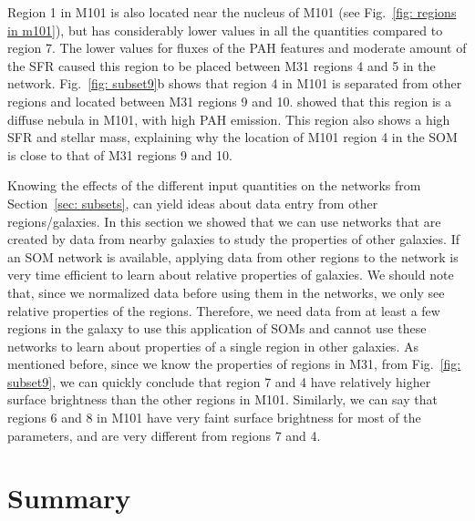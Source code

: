     Region 1 in M101 is also located near the nucleus of M101 (see Fig.~\ref{fig: regions in m101}), but has considerably lower values in all the quantities compared to region 7.
    The lower values for fluxes of the PAH features and moderate amount of the SFR caused this region to be placed between M31 regions 4 and 5 in the network. 
    Fig.~\ref{fig: subset9}b shows that region 4 in M101 is separated from other regions and located between M31 regions 9 and 10.
    \cite{Gordon08} showed that this region is a diffuse nebula in M101, with high PAH emission. 
    This region also shows a high SFR and stellar mass, explaining why the location of M101 region 4 in the SOM is close to that of M31 regions 9 and 10.
    
    Knowing the effects of the different input quantities on the networks from Section~\ref{sec: subsets}, can yield ideas about data entry from other regions/galaxies.
    In this section we showed that we can use networks that are created by data from nearby galaxies to study the properties of other galaxies.
    If an SOM network is available, applying data from other regions to the network is very time efficient to learn about relative properties of galaxies.
    We should note that, since we normalized data before using them in the networks, we only see relative properties of the regions.
    Therefore, we need data from at least a few regions in the galaxy to use this application of SOMs and cannot use these networks to learn about properties of a single region in other galaxies.
    As mentioned before, since we know the properties of regions in M31, from Fig.~\ref{fig: subset9}, we can quickly conclude that region 7 and 4 have relatively higher surface brightness than the other regions in M101. 
    Similarly, we can say that regions 6 and 8 in M101 have very faint surface brightness for most of the parameters, and are very different from regions 7 and 4.
    
    
    
\section{Summary}
\label{sec: summary}

